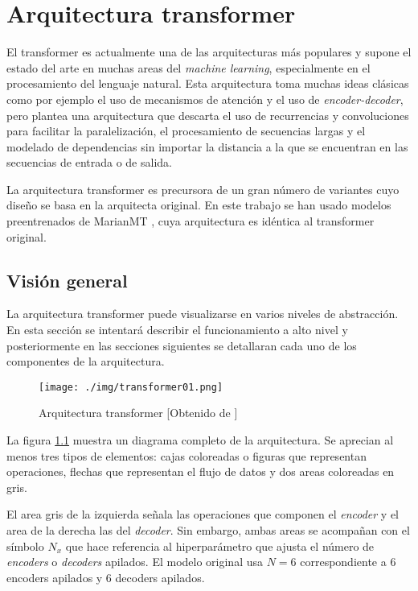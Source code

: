 \chapter{Arquitectura transformer}
El transformer \cite{Vaswani2017Jun} es actualmente una de las arquitecturas más populares y supone el estado del arte en muchas areas del \textit{machine learning}, especialmente en el procesamiento del lenguaje natural. Esta arquitectura toma muchas ideas clásicas como por ejemplo el uso de mecanismos de atención y el uso de \textit{encoder-decoder}, pero plantea una arquitectura que descarta el uso de recurrencias y convoluciones para facilitar la paralelización, el procesamiento de secuencias largas y el modelado de dependencias sin importar la distancia a la que se encuentran en las secuencias de entrada o de salida.

La arquitectura transformer es precursora de un gran número de variantes cuyo diseño se basa en la arquitecta original. En este trabajo se han usado modelos preentrenados de MarianMT \cite{Junczys-Dowmunt2018Apr}, cuya arquitectura es idéntica al transformer original.

\section{Visión general}

La arquitectura transformer puede visualizarse en varios niveles de abstracción. En esta sección se intentará describir el funcionamiento a alto nivel y posteriormente en las secciones siguientes se detallaran cada uno de los componentes de la arquitectura.

\begin{figure}[H]
    \centering
        \texttt{[image: ./img/transformer01.png]}
        \caption{Arquitectura transformer [Obtenido de \cite{Vaswani2017Jun}]}\label{transformerdiagram}
\end{figure}

La figura \ref{transformerdiagram} muestra un diagrama completo de la arquitectura. Se aprecian al menos tres tipos de elementos: cajas coloreadas o figuras que representan operaciones, flechas que representan el flujo de datos y dos areas coloreadas en gris.

El area gris de la izquierda señala las operaciones que componen el \textit{encoder} y el area de la derecha las del \textit{decoder}. Sin embargo, ambas areas se acompañan con el símbolo $N_{x}$ que hace referencia al hiperparámetro que ajusta el número de \textit{encoders} o \textit{decoders} apilados. El modelo original usa $N=6$ correspondiente a 6 encoders apilados y 6 decoders apilados.

